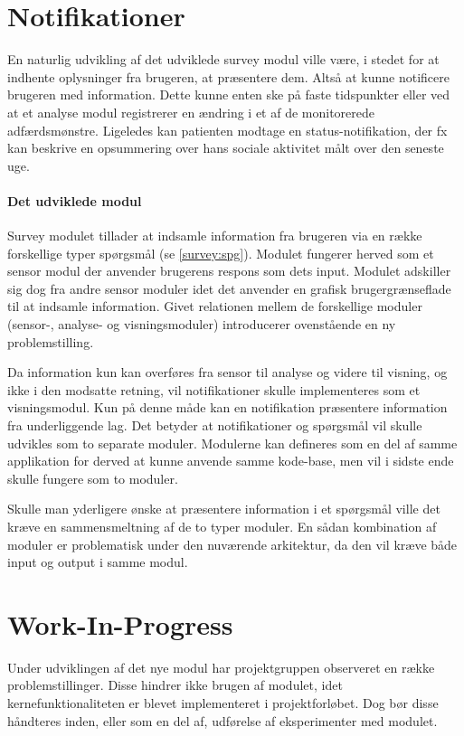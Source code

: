 \section{Notifikationer}
En naturlig udvikling af det udviklede survey modul ville være, i stedet for at indhente oplysninger fra brugeren, at præsentere dem.
Altså at kunne notificere brugeren med information.
Dette kunne enten ske på faste tidspunkter eller ved at et analyse modul registrerer en ændring i et af de monitorerede adfærdsmønstre.
Ligeledes kan patienten modtage en status-notifikation, der fx kan beskrive en opsummering over hans sociale aktivitet målt over den seneste uge.

\paragraph{Det udviklede modul}
Survey modulet tillader at indsamle information fra brugeren via en række forskellige typer spørgsmål (se \cref{survey:spg}).
Modulet fungerer herved som et sensor modul der anvender brugerens respons som dets input.
Modulet adskiller sig dog fra andre sensor moduler idet det anvender en grafisk brugergrænseflade til at indsamle information.
Givet relationen mellem de forskellige moduler (sensor-, analyse- og visningsmoduler) introducerer ovenstående en ny problemstilling.

Da information kun kan overføres fra sensor til analyse og videre til visning, og ikke i den modsatte retning, vil notifikationer skulle implementeres som et visningsmodul.
Kun på denne måde kan en notifikation præsentere information fra underliggende lag.
Det betyder at notifikationer og spørgsmål vil skulle udvikles som to separate moduler.
Modulerne kan defineres som en del af samme applikation for derved at kunne anvende samme kode-base, men vil i sidste ende skulle fungere som to moduler.

Skulle man yderligere ønske at præsentere information i et spørgsmål ville det kræve en sammensmeltning af de to typer moduler.
En sådan kombination af moduler er problematisk under den nuværende arkitektur, da den vil kræve både input og output i samme modul.

\section{Work-In-Progress}
Under udviklingen af det nye modul har projektgruppen observeret en række problemstillinger.
Disse hindrer ikke brugen af modulet, idet kernefunktionaliteten er blevet implementeret i projektforløbet.
Dog bør disse håndteres inden, eller som en del af, udførelse af eksperimenter med modulet.

